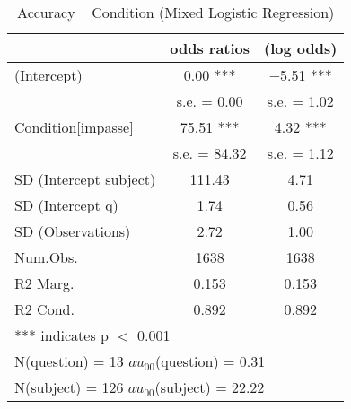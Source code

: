 \begin{table}

\caption{\label{tab:unnamed-chunk-11}Accuracy ~ Condition (Mixed Logistic Regression)}
\centering
\begin{tabular}[t]{lcc}
\toprule
  & odds ratios & (log odds)\\
\midrule
(Intercept) & \num{0.00} *** & \num{-5.51} ***\\
 & s.e. = \num{0.00} & s.e. = \num{1.02}\\
Condition[impasse] & \num{75.51} *** & \num{4.32} ***\\
 & s.e. = \num{84.32} & s.e. = \num{1.12}\\
SD (Intercept subject) & \num{111.43} & \num{4.71}\\
SD (Intercept q) & \num{1.74} & \num{0.56}\\
SD (Observations) & \num{2.72} & \num{1.00}\\
\midrule
Num.Obs. & \num{1638} & \num{1638}\\
R2 Marg. & \num{0.153} & \num{0.153}\\
R2 Cond. & \num{0.892} & \num{0.892}\\
\bottomrule
\multicolumn{3}{l}{\rule{0pt}{1em}*** indicates p $<$ 0.001}\\
\multicolumn{3}{l}{\rule{0pt}{1em}N(question) = 13 $	au_{00}$(question) = 0.31}\\
\multicolumn{3}{l}{\rule{0pt}{1em}N(subject) = 126 $	au_{00}$(subject) = 22.22}\\
\end{tabular}
\end{table}

